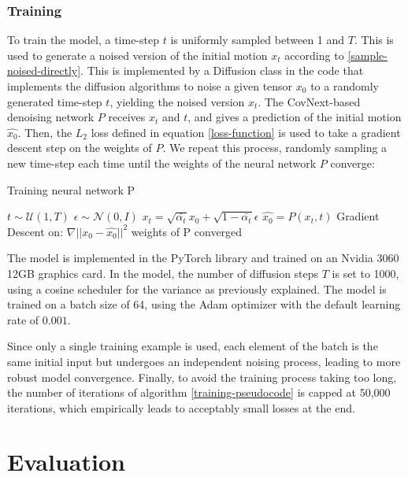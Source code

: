 \documentclass[a4paper, 12pt]{report}
\begin{document}
\subsection{Training}
To train the model, a time-step \(t\) is uniformly sampled between 1 and \(T\). This is used to generate a noised version of the initial motion \(x_t\) according to \ref{sample-noised-directly}. This is implemented by a Diffusion class in the code that implements the diffusion algorithms to noise a given tensor \(x_0\) to a randomly generated time-step \(t\), yielding the noised version \(x_t\). The CovNext-based denoising network \(P\) receives \(x_t\) and \(t\), and gives a prediction of the initial motion \(\hat{x_0}\). Then, the \(L_2\) loss defined in equation \ref{loss-function} is used to take a gradient descent step on the weights of \(P\). We repeat this process, randomly sampling a new time-step each time until the weights of the neural network \(P\) converge:

\begin{algorithm}[H]
	\caption{Training neural network P} \label{training-pseudocode}
	\begin{algorithmic}[1]
		\Repeat
		\State \(t \sim \mathcal{U}(1, T)\)
		\State \(\epsilon \sim \mathcal{N}(0, I)\)
		\State \(x_t = \sqrt{\bar{\alpha_{t}}}{x_0} + \sqrt{1 - \bar{\alpha_{t}}} \epsilon\)
		\State \(\hat{x_0} = P(x_t, t)\)
		\State Gradient Descent on:
		\(\nabla{||x_0 - \hat{x_0}||}^2\)
		\Until weights of P converged
	\end{algorithmic}
\end{algorithm}

The model is implemented in the PyTorch library and trained on an Nvidia 3060 12GB graphics card. In the model, the number of diffusion steps \(T\) is set to 1000, using a cosine scheduler for the variance as previously explained. The model is trained on a batch size of 64, using the Adam optimizer with the default learning rate of \(0.001\). 

Since only a single training example is used, each element of the batch is the same initial input but undergoes an independent noising process, leading to more robust model convergence. Finally, to avoid the training process taking too long, the number of iterations of algorithm \ref{training-pseudocode} is capped at 50,000 iterations, which empirically leads to acceptably small losses at the end.

\chapter{Evaluation}
\end{document}
